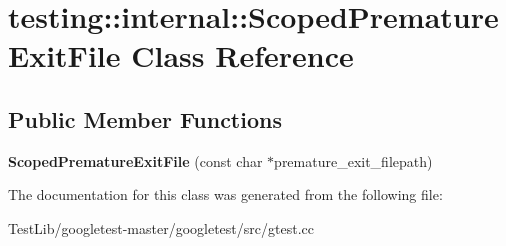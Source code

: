\hypertarget{classtesting_1_1internal_1_1ScopedPrematureExitFile}{}\section{testing\+:\+:internal\+:\+:Scoped\+Premature\+Exit\+File Class Reference}
\label{classtesting_1_1internal_1_1ScopedPrematureExitFile}
\subsection*{Public Member Functions}
\begin{DoxyCompactItemize}
\item 
\mbox{\label{classtesting_1_1internal_1_1ScopedPrematureExitFile_ae520883b8a6984a864ce675acedff4a2}} 
{\bfseries Scoped\+Premature\+Exit\+File} (const char $\ast$premature\+\_\+exit\+\_\+filepath)
\end{DoxyCompactItemize}


The documentation for this class was generated from the following file\+:\begin{DoxyCompactItemize}
\item 
Test\+Lib/googletest-\/master/googletest/src/gtest.\+cc\end{DoxyCompactItemize}
